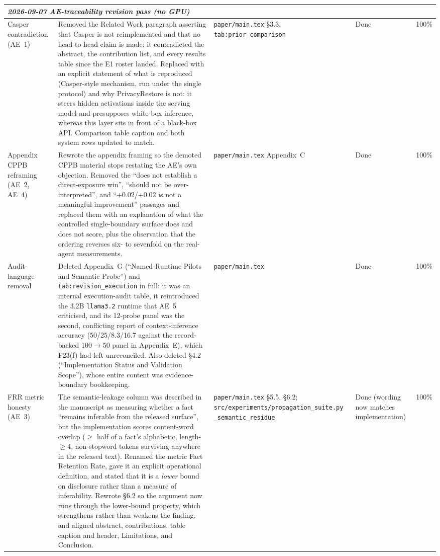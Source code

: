 \documentclass[11pt]{article}
\begin{document}
\begin{longtable}{p{}p{}p{}p{}p{}}
\midrule
\multicolumn{5}{l}{\emph{2026-09-07 AE-traceability revision pass (no GPU)}} \\
\midrule
Casper contradiction (AE~1) & Removed the Related Work paragraph asserting that Casper is not reimplemented and that no head-to-head claim is made; it contradicted the abstract, the contribution list, and every results table since the E1 roster landed. Replaced with an explicit statement of what is reproduced (Casper-style mechanism, run under the single protocol) and why PrivacyRestore is not: it steers hidden activations inside the serving model and presupposes white-box inference, whereas this layer sits in front of a black-box API. Comparison table caption and both system rows updated to match. & \texttt{paper/main.tex} \S3.3, \texttt{tab:prior\_comparison} & Done & 100\% \\
Appendix CPPB reframing (AE~2, AE~4) & Rewrote the appendix framing so the demoted CPPB material stops restating the AE's own objection. Removed the ``does not establish a direct-exposure win'', ``should not be over-interpreted'', and ``+0.02/+0.02 is not a meaningful improvement'' passages and replaced them with an explanation of what the controlled single-boundary surface does and does not score, plus the observation that the ordering reverses six- to sevenfold on the real-agent measurements. & \texttt{paper/main.tex} Appendix~C & Done & 100\% \\
Audit-language removal & Deleted Appendix~G (``Named-Runtime Pilots and Semantic Probe'') and \texttt{tab:revision\_execution} in full: it was an internal execution-audit table, it reintroduced the 3.2B \texttt{llama3.2} runtime that AE~5 criticised, and its 12-probe panel was the second, conflicting report of context-inference accuracy (50/25/8.3/16.7 against the record-backed 100$\rightarrow$50 panel in Appendix~E), which F23(f) had left unreconciled. Also deleted \S4.2 (``Implementation Status and Validation Scope''), whose entire content was evidence-boundary bookkeeping. & \texttt{paper/main.tex} & Done & 100\% \\
FRR metric honesty (AE~3) & The semantic-leakage column was described in the manuscript as measuring whether a fact ``remains inferable from the released surface'', but the implementation scores content-word overlap ($\geq$ half of a fact's alphabetic, length-$\geq$4, non-stopword tokens surviving anywhere in the released text). Renamed the metric Fact Retention Rate, gave it an explicit operational definition, and stated that it is a \emph{lower} bound on disclosure rather than a measure of inferability. Rewrote \S6.2 so the argument now runs through the lower-bound property, which strengthens rather than weakens the finding, and aligned abstract, contributions, table caption and header, Limitations, and Conclusion. & \texttt{paper/main.tex} \S5.5, \S6.2; \texttt{src/experiments/propagation\_suite.py} \texttt{\_semantic\_residue} & Done (wording now matches implementation) & 100\% \\

\end{longtable}
\end{document}
